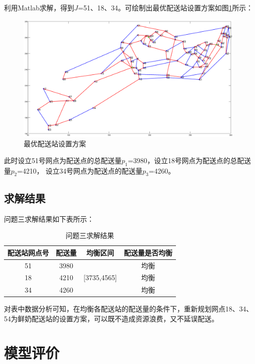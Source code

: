 \documentclass[withoutpreface,bwprint]{cumcmthesis} %
\begin{document}
利用Matlab求解，得到$J$=51、18、34。可绘制出最优配送站设置方案如图\ref{fig:supplyrealg1red}所示：

\begin{figure}[H]
	\centering
	\includegraphics[width=0.85\linewidth]{figures/supply_real_G1_red}
	\caption{最优配送站设置方案}
	\label{fig:supplyrealg1red}
\end{figure}

此时设立51号网点为配送点的总配送量$p_1$=3980，设立18号网点为配送点的总配送量$p_2$=4210，
设立34号网点为配送点的配送量$p_3$=4260。

\subsection{求解结果}
问题三求解结果如下表所示：

\begin{table}[h]
	\centering
	\caption{问题三求解结果}
	\begin{tabular}{cccc} 
		\hline
		配送站网点号 & 配送量  & 均衡区间                           & 配送量是否均衡  \\ 
		\hline
		51     & 3980 & \multirow{3}{*}{{[}3735,4565]} & 均衡       \\
		18     & 4210 &                                & 均衡       \\
		34     & 4260 &                                & 均衡       \\
		\hline
	\end{tabular}
\end{table}

对表中数据分析可知，在均衡各配送站的配送量的条件下，重新规划网点18、34、54为鲜奶配送站的设置方案，可以既不造成资源浪费，又不延误配送。





\section{模型评价}
\end{document}
